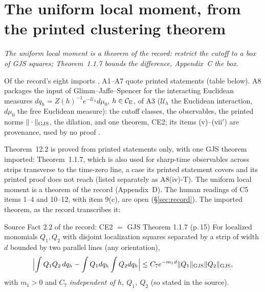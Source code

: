 \section{The uniform local moment, from the printed clustering theorem}\label{sec:import}

\emph{The uniform local moment is a theorem of the record: restrict the cutoff to a box of
GJS squares; Theorem~1.1.7 bounds the difference, Appendix~C the box.}

Of the record's eight imports , A1--A7 quote printed statements (table
below). A8 packages the input of Glimm--Jaffe--Spencer \cite{GJS} for the
interacting Euclidean measures $dq_h=Z(h)^{-1}e^{-\mathcal U_h}d\mu_0$, $h\in\mathcal{C}_{\mathrm E}$, of A3
($\mathcal U_h$ the Euclidean interaction, $d\mu_0$ the free Euclidean measure): the
cutoff classes, the observables, the printed norms $\|\cdot\|_{\rm GJS}$, the dilation, and
one theorem, CE2; its items (v)--(vii$'$) are provenance, used by no proof
.

Theorem~12.2 is proved from printed statements only, with one GJS theorem imported:
Theorem~1.1.7, which is also used for sharp-time observables across strips transverse to
the time-zero line, a case its printed statement covers and its printed proof does not
reach (listed separately as A8(iv)-T). The uniform local moment is a theorem of the record
(Appendix~D). The human readings of C5 items 1--4 and 10--12, with item 9(c), are open
(\S\ref{sec:record}). The imported theorem, as the record transcribes it:

\begin{recordbox}{Source Fact 2.2 of the record: CE2 $=$ GJS Theorem 1.1.7 (p.\,15)}
For localized monomials $Q_1,Q_2$ with disjoint localization squares separated by a strip
of width $d$ bounded by two parallel lines (any orientation),
\[
  \Bigl|\int Q_1Q_2\,dq_h-\int Q_1dq_h\int Q_2dq_h\Bigr|
  \le C_7e^{-m_1d}\|Q_1\|_{\rm GJS}\|Q_2\|_{\rm GJS} ,
\]
with $m_1>0$ and $C_7$ \emph{independent of $h$, $Q_1$, $Q_2$} (so stated in the source).
\end{recordbox}

